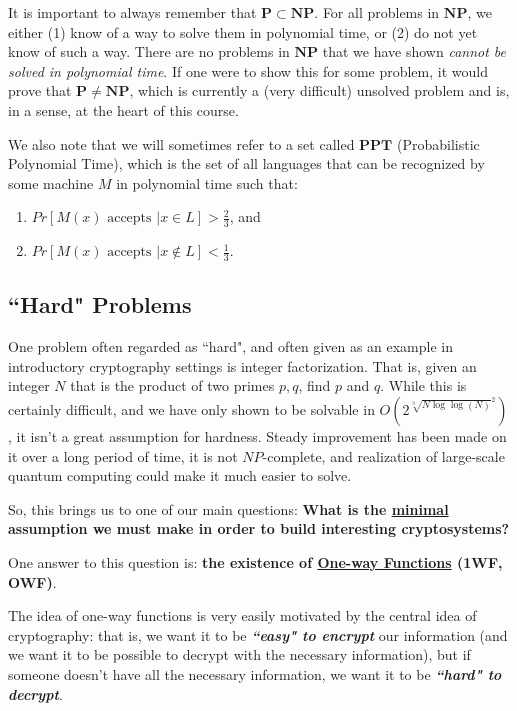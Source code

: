 \documentclass[11pt]{article}
\renewcommand{\P}{\mathbf{P}}
\newcommand{\NP}{\mathbf{NP}}
\begin{document}
It is important to always remember that \(\P\subset \NP\). For all problems in \(\NP\), we either (1) know of a way to solve them in polynomial time, or (2) do not yet know of such a way. There are no problems in \(\NP\) that we have shown \emph{cannot be solved in polynomial time}. If one were to show this for some problem, it would prove that \(\P\ne\NP\), which is currently a (very difficult) unsolved problem and is, in a sense, at the heart of this course.

We also note that we will sometimes refer to a set called \(\mathbf{PPT}\) (Probabilistic Polynomial Time), which is the set of all languages that can be recognized by some machine \(M\) in polynomial time such that: 
\begin{enumerate}
\item \(Pr[M(x)\text{ accepts }|x\in L]>\frac{2}{3}\), and 
\item \(Pr[M(x)\text{ accepts }|x\notin L]<\frac{1}{3}.\)
\end{enumerate}


\subsection{``Hard" Problems}

One problem often regarded as ``hard", and often given as an example in introductory cryptography settings is integer factorization. That is, given an integer \(N\) that is the product of two primes \(p,q\), find \(p\) and \(q\). While this is certainly difficult, and  we have only shown to be solvable in \(O(2^{\sqrt[3]{N\log\log(N)}^2})\), it isn't a great assumption for hardness. Steady improvement has been made on it over a long period of time, it is not \(NP\)-complete, and realization of large-scale quantum computing could make it much easier to solve.\bigskip

So, this brings us to one of our main questions: \textbf{What is the \underline{minimal} assumption we must make in order to build interesting cryptosystems?}

One answer to this question is: \textbf{the existence of \underline{One-way Functions} (1WF, OWF)}.\bigskip

The idea of one-way functions is very easily motivated by the central idea of cryptography: that is, we want it to be \textbf{\emph{``easy" to encrypt}} our information (and we want it to be possible to decrypt with the necessary information), but if someone doesn't have all the necessary information, we want it to be \textbf{\emph{``hard" to decrypt}}.\medskip
\end{document}
